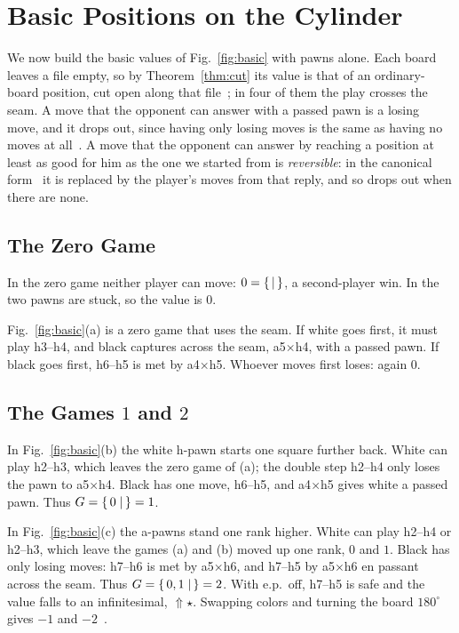 \section{Basic Positions on the Cylinder}\label{sec:basic}

We now build the basic values of Fig.~\ref{fig:basic} with pawns alone. Each board leaves a file empty, so by
Theorem~\ref{thm:cut} its value is that of an ordinary-board position, cut open along that
file~\cite{Elkies1996,WuYuLandry2010}; in four of them the play crosses the seam. A move that the
opponent can answer with a passed pawn is a losing move, and it drops out, since having only losing moves is
the same as having no moves at all~\cite{WinningWays,WuYuLandry2010}. A move that the opponent can answer by reaching a
position at least as good for him as the one we started from is \emph{reversible}: in the canonical
form~\cite{WinningWays} it is replaced by the player's moves from that reply, and so drops out when there are
none.

\subsection{The Zero Game}
In the zero game neither player can move: $0=\{\, \mid \,\}$, a second-player win. In
 the two pawns are stuck, so the value is $0$.

Fig.~\ref{fig:basic}(a) is a zero game that uses the seam. If white goes first, it must play h3--h4, and black
captures across the seam, a5$\times$h4, with a passed pawn. If black goes first, h6--h5 is met by a4$\times$h5.
Whoever moves first loses: again $0$.

\subsection{The Games \texorpdfstring{$1$}{1} and \texorpdfstring{$2$}{2}}
In Fig.~\ref{fig:basic}(b) the white h-pawn starts one square further back. White can play h2--h3, which leaves
the zero game of (a); the double step h2--h4 only loses the pawn to a5$\times$h4. Black has one move, h6--h5,
and a4$\times$h5 gives white a passed pawn. Thus $G=\{\,0 \mid \,\}=1$.

In Fig.~\ref{fig:basic}(c) the a-pawns stand one rank higher. White can play h2--h4 or h2--h3, which leave the
games (a) and (b) moved up one rank, $0$ and $1$. Black has only losing moves: h7--h6 is met by
a5$\times$h6, and h7--h5 by a5$\times$h6 en passant across the seam. Thus $G=\{\,0,1 \mid \,\}=2$. With e.p.\
off, h7--h5 is safe and the value falls to an infinitesimal, ${\Uparrow}\star$. Swapping colors and turning the board $180^\circ$ gives $-1$ and
$-2$~\cite{WuYuLandry2010}.

